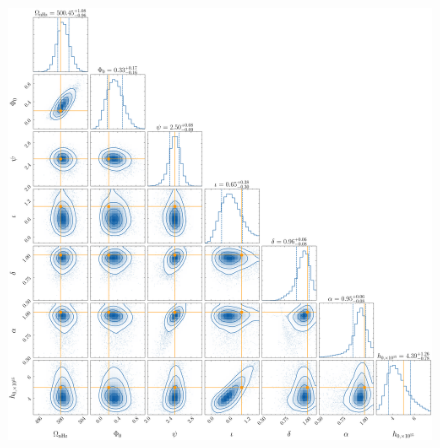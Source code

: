 \documentclass[fleqn,usenatbib,useAMS]{mnras}
\begin{document}
 
 
\begin{figure}
	\includegraphics[width=\textwidth, height =\textwidth ]{images/small_h_posterior_10}

\end{figure}
\end{document}
